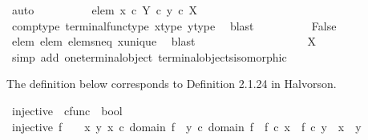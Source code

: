 \begin{isabellebody}
\ auto\isanewline
\ \ \ \ \ \ \ \ \isamarkupfalse%
\ elem{}{\isacharcolon}{\kern0pt}\ {\isachardoublequoteopen}{\isacharparenleft}{\kern0pt}x\ {\isasymcirc}\isactrlsub c\ {\isasymbeta}\isactrlbsub Y\isactrlesub {\isacharparenright}{\kern0pt}\ {\isasymcirc}\isactrlsub c\ y\ {\isasymin}\isactrlsub c\ X{\isachardoublequoteclose}\isanewline
\ \ \ \ \ \ \ \ \ \ \isamarkupfalse%
\ comp{\isacharunderscore}{\kern0pt}type\ terminal{\isacharunderscore}{\kern0pt}func{\isacharunderscore}{\kern0pt}type\ x{\isacharunderscore}{\kern0pt}type\ y{\isacharunderscore}{\kern0pt}type\ \isamarkupfalse%
\ blast\isanewline
\ \ \ \ \ \ \ \ \isamarkupfalse%
\ False\isanewline
\ \ \ \ \ \ \ \ \ \ \isamarkupfalse%
\ elem{}\ elem{}\ elems{\isacharunderscore}{\kern0pt}neq\ x{\isacharunderscore}{\kern0pt}unique\ \isamarkupfalse%
\ blast\isanewline
\ \ \ \ \ \ \isamarkupfalse%
\isanewline
\ \ \ \ \isamarkupfalse%
\isanewline
\ \ \isamarkupfalse%
\isanewline
\ \ \isamarkupfalse%
\ \isamarkupfalse%
\ {\isachardoublequoteopen}X\ {\isasymcong}\ {\isasymone}{\isachardoublequoteclose}\isanewline
\ \ \ \ \isamarkupfalse%
\ {\isacharparenleft}{\kern0pt}simp\ add{\isacharcolon}{\kern0pt}\ one{\isacharunderscore}{\kern0pt}terminal{\isacharunderscore}{\kern0pt}object\ terminal{\isacharunderscore}{\kern0pt}objects{\isacharunderscore}{\kern0pt}isomorphic{\isacharparenright}{\kern0pt}\isanewline
{}\isamarkupfalse%
%
\endisatagproof
{\isafoldproof}%
%
\isadelimproof
%
\endisadelimproof
%
\isadelimdocument
%
\endisadelimdocument
%
\isatagdocument
%
\isamarkuptrue%
%
\endisatagdocument
{\isafolddocument}%
%
\isadelimdocument
%
\endisadelimdocument
%
\begin{isamarkuptext}%
The definition below corresponds to Definition 2.1.24 in Halvorson.%
\end{isamarkuptext}\isamarkuptrue%
\isamarkupfalse%
\ injective\ {\isacharcolon}{\kern0pt}{\isacharcolon}{\kern0pt}\ {\isachardoublequoteopen}cfunc\ {\isasymRightarrow}\ bool{\isachardoublequoteclose}\ \isanewline
\ {\isachardoublequoteopen}injective\ f\ \ {\isasymlongleftrightarrow}\ {\isacharparenleft}{\kern0pt}{\isasymforall}\ x\ y{\isachardot}{\kern0pt}\ {\isacharparenleft}{\kern0pt}x\ {\isasymin}\isactrlsub c\ domain\ f\ {\isasymand}\ y\ {\isasymin}\isactrlsub c\ domain\ f\ {\isasymand}\ f\ {\isasymcirc}\isactrlsub c\ x\ {\isacharequal}{\kern0pt}\ f\ {\isasymcirc}\isactrlsub c\ y{\isacharparenright}{\kern0pt}\ {\isasymlongrightarrow}\ x\ {\isacharequal}{\kern0pt}\ y{\isacharparenright}{\kern0pt}{\isachardoublequoteclose}\isanewline

\end{isabellebody}
